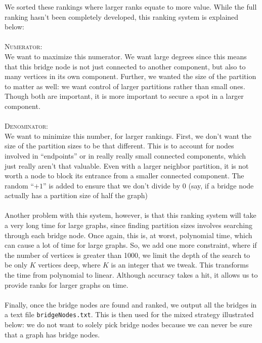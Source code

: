 \documentclass{article}
\begin{document}
  We sorted these rankings where larger ranks equate to more value. While the 
  full ranking hasn't been completely developed, this ranking system is explained below: \\ \\
  \textsc{Numerator}: \\
  We want to maximize this numerator. We want large degrees since this means
  that this bridge node is not just connected to another component, but also to many vertices in its own component. Further, we wanted the size of the 
  partition to matter as well: we want control of larger partitions rather
  than small ones. Though both are important, it is more important to
  secure a spot in a larger component.
  \\ \\
  \textsc{Denominator}: \\
  We want to minimize this number, for larger rankings. First, we don't want
  the size of the partition sizes to be that different. This is to account for nodes involved in ``endpoints'' or in really really small connected 
  components, which just really aren't that valuable. Even with a larger
  neighbor partition, it is not worth a node to block its entrance from a
  smaller connected component. The random ``$+ 1$'' is added to ensure
  that we don't divide by 0 (say, if a bridge node actually has a partition
  size of half the graph)
  \\ \\
  Another problem with this system, however, is that this ranking system
  will take a very long time for large graphs, since finding partition sizes 
  involves searching through each bridge node. Once again, this is, at worst,
  polynomial time, which can cause a lot of time for large graphs. So, we
  add one more constraint, where if the number of vertices is greater than 
  1000, we limit the depth of the search to be only $K$ vertices deep, where $K$ is an integer that we tweak. This transforms the time from polynomial to linear. Although accuracy takes a hit, it allows us to provide ranks for
  larger graphs on time.
  \\ \\
  Finally, once the bridge nodes are found and ranked, we output all the 
  bridges in a text file \texttt{bridgeNodes.txt}. This is then used for
  the mixed strategy illustrated below: we do not want to solely pick 
  bridge nodes because we can never be sure that a graph has bridge nodes.
\end{document}

